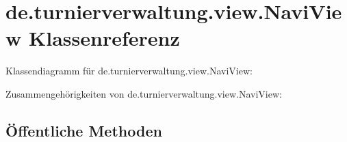 \hypertarget{classde_1_1turnierverwaltung_1_1view_1_1_navi_view}{}\section{de.\+turnierverwaltung.\+view.\+Navi\+View Klassenreferenz}
\label{classde_1_1turnierverwaltung_1_1view_1_1_navi_view}


Klassendiagramm für de.\+turnierverwaltung.\+view.\+Navi\+View\+:


Zusammengehörigkeiten von de.\+turnierverwaltung.\+view.\+Navi\+View\+:
\subsection*{Öffentliche Methoden}
